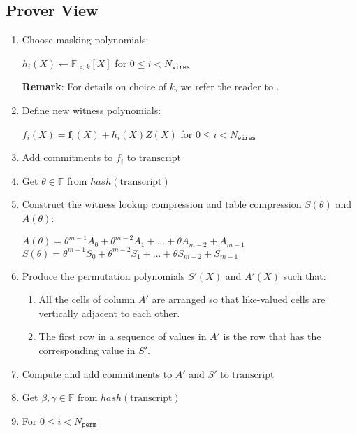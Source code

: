 \subsection{Prover View}
\begin{enumerate}
    \item Choose masking polynomials: 
        \begin{center}
            $h_i(X) \leftarrow \mathbb{F}_{<k}[X]$ for $0 \leq i < N_{\texttt{wires}}$
        \end{center}
        \textbf{Remark}: For details on choice of $k$, we refer the reader to \cite{cryptoeprint:2019:1400}.
    \item Define new witness polynomials:
        \begin{center}
            $f_i(X) = \textbf{f}_{i}(X) + h_i(X)Z(X)$ for $0 \leq i < N_{\texttt{wires}}$
        \end{center}
    \item Add commitments to $f_i$ to $\text{transcript}$
    \item Get $\theta \in \mathbb{F}$ from $hash(\text{transcript})$
    \item Construct the witness lookup compression and table compression $S(\theta)$ and $A(\theta)$:
        \begin{center}
            $A(\theta) = \theta^{m - 1} A_{0} + \theta^{m - 2} A_{1} + ... + \theta A_{ m - 2} + A_{m - 1}$ \\
            $S(\theta) = \theta^{m-1} S_{0} + \theta^{m-2} S_{1} + ... + \theta S_{m-2} + S_{m-1}$
        \end{center}
    \item Produce the permutation polynomials $S'(X)$ and $A'(X)$ such that:
        \begin{enumerate}
            \item All the cells of column $A'$ are arranged so that like-valued cells are vertically adjacent to each other. 
            \item The first row in a sequence of values in $A'$ is the row that has the corresponding value in $S'$.
        \end{enumerate}
    \item Compute and add commitments to $A'$ and $S'$ to $\text{transcript}$
    \item Get $\beta, \gamma \in \mathbb{F}$ from $hash(\text{transcript})$
    \item For $0 \leq i < N_{\texttt{perm}}$
        \begin{center}

\end{center}
\end{enumerate}
